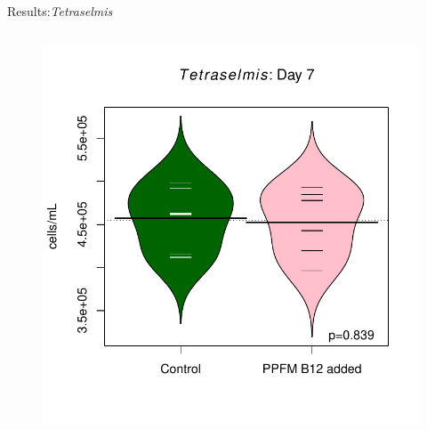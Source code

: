\documentclass[8pt]{beamer}\usepackage[]{graphicx}\usepackage[]{color}
\begin{document}
\begin{frame}{Results:{\it Tetraselmis}}
\begin{columns}[t]
\begin{figure}
                                \includegraphics[width=1\textwidth]{./figure/Tetraselmis_beanplot.pdf}
                                \end{figure}
                                \end{columns}
\end{frame}
\end{document}

